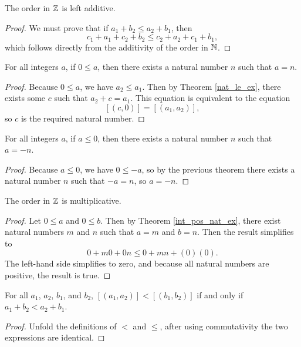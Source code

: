 \documentclass[../../math.tex]{subfiles}
\begin{document}
\begin{instance}
    The order in $\mathbb{Z}$ is left additive.
\end{instance}
\begin{proof}
    We must prove that if $a_1 + b_2 \leq a_2 + b_1$, then
    \[
        c_1 + a_1 + c_2 + b_2 \leq c_2 + a_2 + c_1 + b_1,
    \]
    which follows directly from the additivity of the order in $\mathbb{N}$.
\end{proof}

\begin{theorem} \label{int_pos_nat_ex}
    For all integers $a$, if $0 \leq a$, then there exists a natural number $n$
    such that $a = n$.
\end{theorem}
\begin{proof}
    Because $0 \leq a$, we have $a_2 \leq a_1$.  Then by Theorem
    \ref{nat_le_ex}, there exists some $c$ such that $a_2 + c = a_1$.  This
    equation is equivalent to the equation
    \[
        [(c, 0)] = [(a_1, a_2)],
    \]
    so $c$ is the required natural number.
\end{proof}

\begin{theorem} \label{int_neg_nat_ex}
    For all integers $a$, if $a \leq 0$, then there exists a natural number $n$
    such that $a = -n$.
\end{theorem}
\begin{proof}
    Because $a \leq 0$, we have $0 \leq -a$, so by the previous theorem there
    exists a natural number $n$ such that $-a = n$, so $a = -n$.
\end{proof}

\begin{instance}
    The order in $\mathbb{Z}$ is multiplicative.
\end{instance}
\begin{proof}
    Let $0 \leq a$ and $0 \leq b$.  Then by Theorem \ref{int_pos_nat_ex}, there
    exist natural numbers $m$ and $n$ such that $a = m$ and $b = n$.  Then the
    result simplifies to
    \[
        0 + m0 + 0n \leq 0 + mn + (0)(0).
    \]
    The left-hand side simplifies to zero, and because all natural numbers are
    positive, the result is true.
\end{proof}

\begin{theorem}
    For all $a_1$, $a_2$, $b_1$, and $b_2$, $[(a_1, a_2)] < [(b_1, b_2)]$ if and
    only if $a_1 + b_2 < a_2 + b_1$.
\end{theorem}
\begin{proof}
    Unfold the definitions of $<$ and $\leq$, after using commutativity the two
    expressions are identical.
\end{proof}
\end{document}
